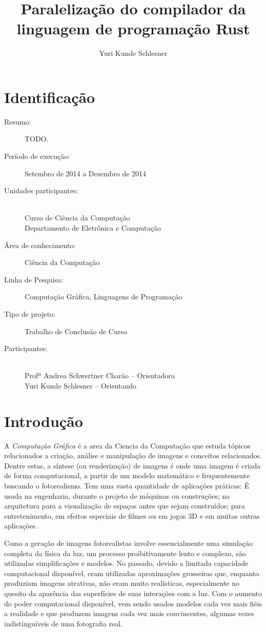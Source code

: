 \documentclass[12pt]{article}
\title{Paralelização do compilador da linguagem de programação Rust}
\author{Yuri Kunde Schlesner}
\newcommand{\todo}[1]{\textsf{\color{red}#1}}
\begin{document}
\maketitle

\section{Identificação}

\begin{description}
	\item[Resumo:] \todo{TODO.}
	\item[Período de execução:] Setembro de 2014 a Dezembro de 2014
	\item[Unidades participantes:] ~\\ Curso de Ciência da Computação \\ Departamento de Eletrônica e Computação
	\item[Área de conhecimento:] Ciência da Computação
	\item[Linha de Pesquisa:] Computação Gráfica, Linguagens de Programação
	\item[Tipo de projeto:] Trabalho de Conclusão de Curso
	\item[Participantes:] ~\\ Profª Andrea Schwertner Charão -- Orientadora \\ Yuri Kunde Schlesner -- Orientando
\end{description}

\section{Introdução}

A \emph{Computação Gráfica} é a area da Ciencia da Computação que estuda tópicos relacionados a criação, análise e manipulação de imagens e conceitos relacionados. Dentre estas, a síntese (ou renderização) de imagens é onde uma imagem é criada de forma computacional, a partir de um modelo matemático e frequentemente buscando o fotorealismo. Tem uma vasta quantidade de aplicações práticas: É usada na engenharia, durante o projeto de máquinas ou construções; na arquitetura para a visualização de espaços antes que sejam construídos; para entretenimento, em efeitos especiais de filmes ou em jogos 3D e em muitas outras aplicações.

Como a geração de imagens fotorealistas involve essencialmente uma simulação completa da física da luz, um processo proibitivamente lento e complexo, são utilizadas simplificações e modelos. No passado, devido a limitada capacidade computacional disponível, eram utilizadas aproximações grosseiras que, enquanto produziam imagens atrativas, não eram muito realísticas, especialmente no quesito da aparência das superfícies de suas interações com a luz. Com o aumento do poder computacional disponível, vem sendo usados modelos cada vez mais fiéis a realidade e que produzem imagens cada vez mais convincentes, algumas vezes indistinguíveis de uma fotografia real.
\end{document}
